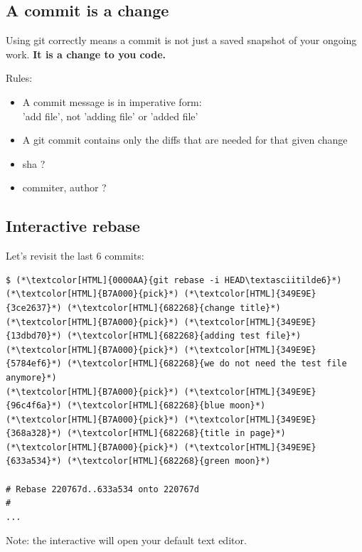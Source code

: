 \subsection{A commit is a change}
\begin{frame}[fragile]
  \subslidetitle

  Using git correctly means a commit is not just a saved snapshot of your ongoing work. \textbf{It is a change to you code.}

  \vspace{1em}
  Rules:
  \begin{itemize}
    \item A commit message is in imperative form: \\
      'add file', not 'adding file' or 'added file'
    \item A git commit contains only the diffs that are needed for that given change
    \item sha ?
      \item commiter, author ?

  \end{itemize}
\end{frame}


\subsection{Interactive rebase}
\begin{frame}[fragile]
  \subslidetitle

  Let's revisit the last 6 commits:
  \begin{lstlisting}
$ (*\textcolor[HTML]{0000AA}{git rebase -i HEAD\textasciitilde6}*)
(*\textcolor[HTML]{B7A000}{pick}*) (*\textcolor[HTML]{349E9E}{3ce2637}*) (*\textcolor[HTML]{682268}{change title}*)
(*\textcolor[HTML]{B7A000}{pick}*) (*\textcolor[HTML]{349E9E}{13dbd70}*) (*\textcolor[HTML]{682268}{adding test file}*)
(*\textcolor[HTML]{B7A000}{pick}*) (*\textcolor[HTML]{349E9E}{5784ef6}*) (*\textcolor[HTML]{682268}{we do not need the test file anymore}*)
(*\textcolor[HTML]{B7A000}{pick}*) (*\textcolor[HTML]{349E9E}{96c4f6a}*) (*\textcolor[HTML]{682268}{blue moon}*)
(*\textcolor[HTML]{B7A000}{pick}*) (*\textcolor[HTML]{349E9E}{368a328}*) (*\textcolor[HTML]{682268}{title in page}*)
(*\textcolor[HTML]{B7A000}{pick}*) (*\textcolor[HTML]{349E9E}{633a534}*) (*\textcolor[HTML]{682268}{green moon}*)

# Rebase 220767d..633a534 onto 220767d
#
...
\end{lstlisting}

  Note: the interactive  will open your default text editor.
\end{frame}

